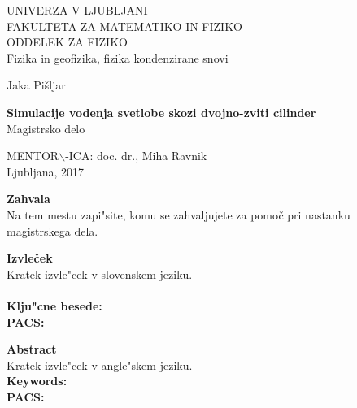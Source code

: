 \documentclass[longbibliography,slovene,a4paper,12pt]{book}
\begin{document}

\pagestyle{empty}
\begin{center}

{\large UNIVERZA V LJUBLJANI\\
FAKULTETA ZA MATEMATIKO IN FIZIKO\\
ODDELEK ZA FIZIKO\\
Fizika in geofizika, fizika kondenzirane snovi\\}


\vspace{4cm}


{\Large Jaka Pišljar\\}

\vspace{10mm}

{\bf \Large Simulacije vodenja svetlobe skozi dvojno-zviti cilinder}\\
\vspace{5mm}
{\large Magistrsko delo}\\




\vfill



{\large MENTOR$\backslash$-ICA: doc. dr., Miha Ravnik\\


\vspace{2cm}
Ljubljana, 2017}

\end{center}


\cleardoublepage
\mbox{}
\vfill
{\Large \bf Zahvala}
\vspace{1cm}\\
Na tem mestu zapi"site, komu se zahvaljujete za pomoč pri nastanku magistrskega dela.


\cleardoublepage
{\Large \bf Izvleček}
\vspace{1cm}\\
Kratek izvle"cek v slovenskem jeziku.\\
\vspace{1cm}\\
{\bf Klju"cne besede:}\\
{\bf PACS:}


\cleardoublepage
{\Large \bf Abstract}
\vspace{1cm}\\
Kratek izvle"cek v angle"skem jeziku.
\vspace{1cm}\\
{\bf Keywords:}\\
{\bf PACS:}
\end{document}
